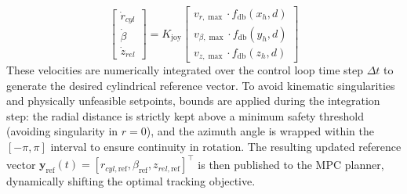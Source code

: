 \begin{equation}
    \begin{bmatrix} \dot{r}_{cyl} \\ \dot{\beta} \\ \dot{z}_{rel} \end{bmatrix} = 
    K_{\text{joy}} \begin{bmatrix} 
    v_{r,\max} \cdot f_{\text{db}}(x_h, d) \\ 
    v_{\beta,\max} \cdot f_{\text{db}}(y_h, d) \\ 
    v_{z,\max} \cdot f_{\text{db}}(z_h, d) 
    \end{bmatrix}
\end{equation}
These velocities are numerically integrated over the control loop time step $\Delta t$ to generate the desired cylindrical reference vector. To avoid kinematic singularities and physically unfeasible setpoints, bounds are applied during the integration step: the radial distance is strictly kept above a minimum safety threshold (avoiding singularity in $r=0$), and the azimuth angle is wrapped within the $[-\pi, \pi]$ interval to ensure continuity in rotation. The resulting updated reference vector $\mathbf{y}_{\text{ref}}(t) = [r_{cyl,\text{ref}}, \beta_{\text{ref}}, z_{rel,\text{ref}}]^\top$ is then published to the MPC planner, dynamically shifting the optimal tracking objective.

